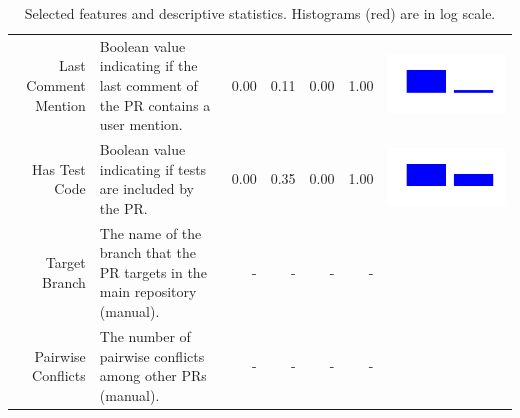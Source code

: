 \begin{table}[ht]
\begin{tabular}{rp{26em}rrrrc}
    Last Comment Mention & Boolean value indicating if the last comment of the PR contains a user mention. & 0.00 & 0.11 & 0.00 & 1.00 & \includegraphics[scale = 0.1, clip = true, trim= 50px 60px 50px 60px]{../figs/hist-features/hist-lastCommentMention.pdf} \\
    Has Test Code & Boolean value indicating if tests are included by the PR. & 0.00 & 0.35 & 0.00 & 1.00 & \includegraphics[scale = 0.1, clip = true, trim= 50px 60px 50px 60px]{../figs/hist-features/hist-hasTestCode.pdf} \\
    Target Branch & The name of the branch that the PR targets in the main repository (manual). & - & - & - & - & \\
    Pairwise Conflicts & The number of pairwise conflicts among other PRs (manual). & - & - & - & - & \\
    \hline
  \end{tabular}
  \caption{Selected features and descriptive statistics. Histograms (red) are in log scale.}
  \label{tab:features}
\end{table}

